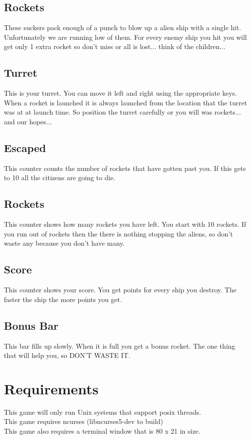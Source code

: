 \documentclass{article}
\begin{document}
\subsection{Rockets}
These suckers pack enough of a punch to blow up a alien ship with a single hit.
Unfortunately we are running low of them. For every enemy ship you hit you will
get only 1 extra rocket so don't miss or all is lost... think of the children...

\subsection{Turret}
This is your turret. You can move it left and right using the appropriate 
keys. When a rocket is launched it is always launched from the location that 
the turret was at at launch time. So position the turret carefully or you will
was rockets... and our hopes...

\subsection{Escaped}
This counter counts the number of rockets that have gotten past you. If this gets to 10 all the citizens are going to die.

\subsection{Rockets}
This counter shows how many rockets you have left. You start with 10 rockets. 
If you run out of rockets then the there is nothing stopping the aliens, so 
don't waste any because you don't have many.

\subsection{Score}
This counter shows your score. You get points for every ship you destroy. The 
faster the ship the more points you get.

\subsection{Bonus Bar}
This bar fills up slowly. When it is full you get a bonus rocket. The one thing 
that will help you, so DON'T WASTE IT.

\pagebreak

\section{Requirements}
This game will only run Unix systems that support posix threads.\\
This game requires ncurses (libncurses5-dev to build)\\
This game also requires a terminal window that is 80 x 21 in size.\\
\end{document}
